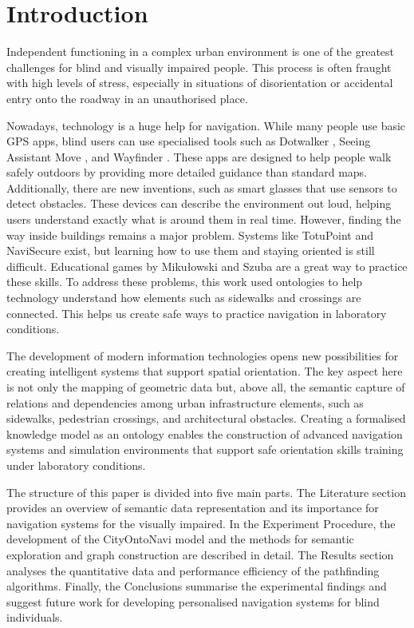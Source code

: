\documentclass[conference]{IEEEtran}
\begin{document}
\section{Introduction}
Independent functioning in a complex urban environment is one of the greatest challenges for blind and visually impaired people. This process is often fraught with high levels of stress, especially in situations of disorientation or accidental entry onto the roadway in an unauthorised place. 

Nowadays, technology is a huge help for navigation. While many people use basic GPS apps, blind users can use specialised tools such as Dotwalker \cite{Dotwalker}, Seeing Assistant Move \cite{SeeingAssistantMove}, and Wayfinder \cite{Wayfinder}. These apps are designed to help people walk safely outdoors by providing more detailed guidance than standard maps. Additionally, there are new inventions, such as smart glasses that use sensors to detect obstacles. These devices can describe the environment out loud, helping users understand exactly what is around them in real time.
However, finding the way inside buildings remains a major problem. 
Systems like TotuPoint \cite{TOTUPOINT} and NaviSecure \cite{Navisecure} exist, but learning how to use them and staying oriented is still difficult. 
Educational games by Mikułowski and Szuba \cite{MikulowskiSzuba2025} are a great way to practice these skills. 
To address these problems, this work used ontologies to help technology understand how elements such as sidewalks and crossings are connected. This helps us create safe ways to practice navigation in laboratory conditions.

The development of modern information technologies opens new possibilities for creating intelligent systems that support spatial orientation. The key aspect here is not only the mapping of geometric data but, above all, the semantic capture of relations and dependencies among urban infrastructure elements, such as sidewalks, pedestrian crossings, and architectural obstacles. Creating a formalised knowledge model as an ontology enables the construction of advanced navigation systems and simulation environments that support safe orientation skills training under laboratory conditions.

The structure of this paper is divided into five main parts. The Literature section provides an overview of semantic data representation and its importance for navigation systems for the visually impaired. In the Experiment Procedure, the development of the CityOntoNavi model and the methods for semantic exploration and graph construction are described in detail. The Results section analyses the quantitative data and performance efficiency of the pathfinding algorithms. Finally, the Conclusions summarise the experimental findings and suggest future work for developing personalised navigation systems for blind individuals.
\end{document}
